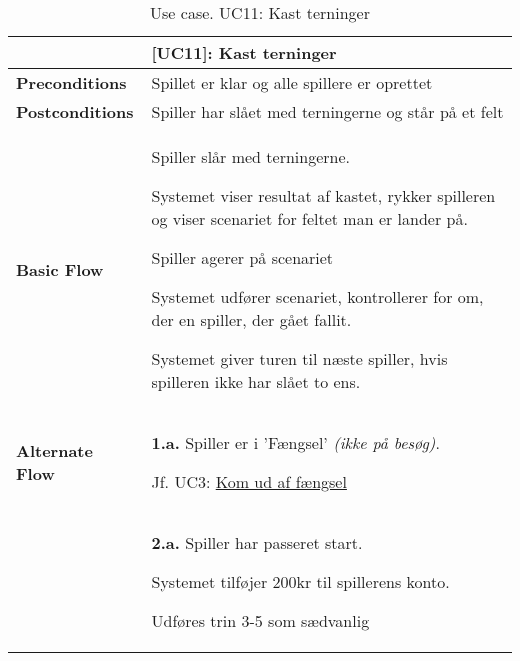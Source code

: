 \documentclass[class=article, crop=false]{standalone}
\begin{document}
    \begin{table}[H]
        \caption{Use case. UC11: Kast terninger}
        \begin{tabularx}{\textwidth}{|l|X|}
            \hline
            & \textbf{[UC11]: Kast terninger}   \\ \hline
            \textbf{Preconditions}       & Spillet er klar og alle spillere er oprettet\\ \hline
            \textbf{Postconditions}      & Spiller har slået med terningerne og står på et felt\\ \hline


            \textbf{Basic Flow} & \begin{tabenum}
                                      \item Spiller slår med terningerne.
                                      \item Systemet viser resultat af kastet, rykker spilleren og viser scenariet for feltet man er lander på.
                                      \item Spiller agerer på scenariet
                                      \item Systemet udfører scenariet, kontrollerer for om, der en spiller, der gået fallit.
                                      \item Systemet giver turen til næste spiller, hvis spilleren ikke har slået to ens.
            \end{tabenum}   \\ \hline




            \textbf{Alternate Flow}   & \textbf{1.a.} Spiller er i 'Fængsel' \textit{(ikke på besøg)}.
            \begin{enumerate} \begin{tabenum}
                                  \item Jf. UC3: \underline{Kom ud af fængsel}
            \end{tabenum} \end{enumerate}
            \\


            & \textbf{2.a.} Spiller har passeret start.
            \begin{enumerate} \begin{tabenum}
                                  \item Systemet tilføjer 200kr til spillerens konto.
                                  \item Udføres trin 3-5 som sædvanlig
            \end{tabenum} \end{enumerate}
            \\



\end{tabularx}
\end{table}
\end{document}
